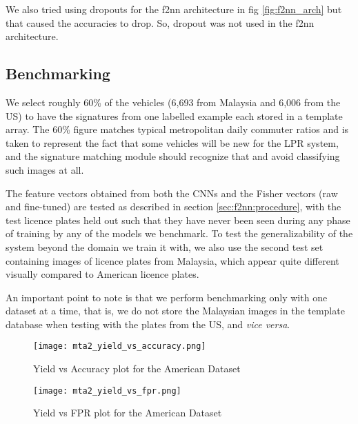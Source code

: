 \documentclass[10pt,twocolumn,letterpaper]{article}
\begin{document}
    We also tried using dropouts \cite{srivastava2014dropout} for the f2nn architecture in fig \ref{fig:f2nn_arch} but that caused the accuracies to drop. So, dropout was not used in the f2nn architecture.
    \subsection{Benchmarking \label{sec:expt:benchmark}}
        We select roughly 60\% of the vehicles (6,693 from Malaysia and 6,006 from the US) to have the signatures from one labelled example each stored in a template array. The 60\% figure matches typical metropolitan daily commuter ratios and is taken to represent the fact that some vehicles will be new for the LPR system, and the signature matching module should recognize that and avoid classifying such images at all.
        
        The feature vectors obtained from both the CNNs and the Fisher vectors (raw and fine-tuned) are tested as described in section \ref{sec:f2nn:procedure}, with the test licence plates held out such that they have never been seen during any phase of training by any of the models we benchmark. To test the generalizability of the system beyond the domain we train it with, we also use the second test set containing images of licence plates from Malaysia, which appear quite different visually compared to American licence plates.
        
        An important point to note is that we perform benchmarking only with one dataset at a time, that is, we do not store the Malaysian images in the template database when testing with the plates from the US, and \emph{vice versa}.
        
        \begin{figure}[!t]
        \begin{center}
            \texttt{[image: mta2\_yield\_vs\_accuracy.png]}
            \caption{Yield vs Accuracy plot for the American Dataset}
            \label{fig:mta2_acc}
        \end{center}
        \end{figure}
        
        \begin{figure}[!t]
        \begin{center}
            \texttt{[image: mta2\_yield\_vs\_fpr.png]}
            \caption{Yield vs FPR plot for the American Dataset}
            \label{fig:mta2_fpr}
        \end{center}
        \end{figure}
    
\end{document}
